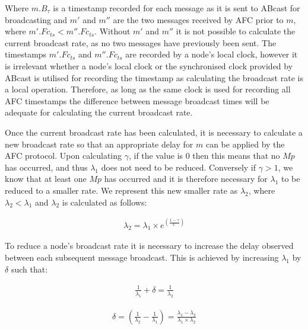    Where $m.B_\tau$ is a timestamp recorded for each message as it is sent to \textsf{ABcast} for broadcasting and $m'$ and $m''$ are the two messages received by AFC prior to $m$, where $m'.Fc_{ts} < m''.Fc_{ts}$.  Without $m'$ and $m''$ it is not possible to calculate the current broadcast rate, as no two messages have previously been sent.  The timestamps $m'.Fc_{ts}$ and $m''.Fc_{ts}$ are recorded by a node's local clock, however it is irrelevant whether a node's local clock or the  synchronised clock provided by \textsf{ABcast} is utilised for recording the timestamp as calculating the broadcast rate is a local operation.  Therefore, as long as the same clock is used for recording all AFC timestamps the difference between message broadcast times will be adequate for calculating the current broadcast rate.   
    
    Once the current broadcast rate has been calculated, it is necessary to calculate a new broadcast rate so that an appropriate delay for $m$ can be applied by the AFC protocol.  Upon calculating $\gamma$, if the value is $0$ then this means that no $Mp$ has occurred, and thus $\lambda_1$ does not need to be reduced.  Conversely if $\gamma > 1$, we know that at least one $Mp$ has occurred and it is therefore necessary for $\lambda_1$ to be reduced to a smaller rate.  We represent this new smaller rate as $\lambda_2$, where $\lambda_2 < \lambda_1$ and $\lambda_2$ is calculated as follows:
    
      \begin{equation*}
		     \begin{aligned}
		         \lambda_2 = \lambda_1 \times e ^{ ({\frac{1-\gamma}{C}})}
		     \end{aligned}
    \end{equation*} 
    
    To reduce a node's broadcast rate it is necessary to increase the delay observed between each subsequent message broadcast.  This is achieved by increasing $\lambda_1$ by $\delta$ such that:
    
    \begin{equation} \label{eq:rate_plus_delta}
		     \begin{aligned}
		         \frac{1}{\lambda_1} + \delta = \frac{1}{\lambda_2}
		     \end{aligned}
    \end{equation} 
    
    \begin{equation}
		     \begin{aligned}
		         \delta = (\frac{1}{\lambda_2} - \frac{1}{\lambda_1}) = \frac{\lambda_1 - \lambda_2}{\lambda_1 \times \lambda_2}
		     \end{aligned}
    \end{equation} 
        
